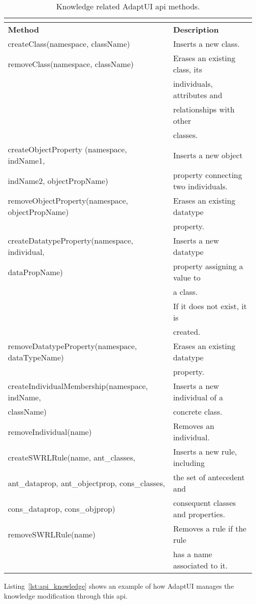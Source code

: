 \begin{center}
\footnotesize
\begin{longtable}{l l}
  \caption{Knowledge related AdaptUI \ac{api} methods.}				\\
  \label{tbl:api_knowledge} \\
  \hline
  \textbf{Method}		& \textbf{Description}				\\
  \hline
  createClass(namespace, className)	& Inserts a new class.			\\
  removeClass(namespace, className)	& Erases an existing class, its		\\
					& individuals, attributes and		\\
					& relationships with other 		\\
					& classes.				\\
  \hline
  createObjectProperty	(namespace, indName1,& Inserts a new object		\\
  indName2, objectPropName)	& property connecting two individuals.		\\
  removeObjectProperty(namespace, objectPropName)& Erases an existing datatype	\\
 					& property.				\\
  \hline
  createDatatypeProperty(namespace, individual,& Inserts a new datatype		\\
  dataPropName)				& property assigning a value to 	\\
 					& a class.				\\
					& If it does not exist, it is		\\
					& created.				\\
  removeDatatypeProperty(namespace, dataTypeName)& Erases an existing datatype	\\
 					& property.				\\
  \hline
  createIndividualMembership(namespace, indName,& Inserts a new individual of a \\
  className)				& concrete class.			\\
  removeIndividual(name)	 	& Removes an individual.		\\
  \hline
  createSWRLRule(name, ant\_classes, 	& Inserts a new rule, including		\\
  ant\_dataprop, ant\_objectprop, cons\_classes,& the set of antecedent and	\\
  cons\_dataprop, cons\_objprop)	& consequent classes and properties.	\\
  removeSWRLRule(name)	 		& Removes a rule if the rule 		\\
					& has a name associated to it.		\\
  \hline
\end{longtable}
\end{center}

Listing~\ref{lst:api_knowledge} shows an example of how AdaptUI manages the
knowledge modification through this \ac{api}. 


\inputminted[linenos=true, fontsize=\footnotesize, frame=lines]{java}{4_system_architecture/api_knowledge.java}
